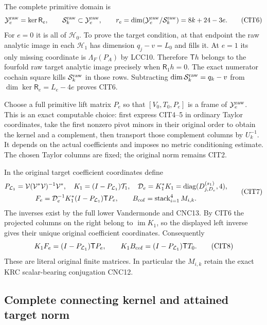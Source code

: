 \documentclass[10pt]{article}
\begin{document}
The complete primitive domain is
\[
 \mathcal Y_e^{\rm raw}=\ker\mathsf R_e,\qquad
 \mathcal S_k^{\rm raw}\subset\mathcal Y_e^{\rm raw},\qquad
 r_e=\dim(\mathcal Y_e^{\rm raw}/\mathcal S_k^{\rm raw})
                  =8k+24-3e .
 \tag{CIT6}
\]
For $e=0$ it is all of $\mathcal H_0$. To prove the target
condition, at that endpoint the raw analytic image in each
$\mathcal H_1$ has dimension $q_j-v=L_0$ and fills it.
At $e=1$ its only missing coordinate is
$\Lambda_F(P_A)$ by LCC10. Therefore
$\mathsf T h$ belongs to the fourfold raw target analytic
image precisely when $\mathsf R_1h=0$. The exact numerator
cochain square kills $\mathcal S_k^{\rm raw}$ in those rows.
Subtracting $\dim\mathcal S_k^{\rm raw}=q_k-v$ from
$\dim\ker\mathsf R_e=L_e-4e$ proves CIT6.

Choose a full primitive lift matrix $P_e$ so that
$[V_0,T_0,P_e]$ is a frame of $\mathcal Y_e^{\rm raw}$.
This is an exact computable choice: first express CIT4--5 in
ordinary Taylor coordinates, take the first nonzero pivot minors
in their original order to obtain the kernel and a complement,
then transport those complement columns by $U_k^{-1}$.
It depends on the actual coefficients and imposes no metric
conditioning estimate. The chosen Taylor columns are fixed;
the original norm remains CIT2.

In the original target coefficient coordinates define
\[
 \begin{gathered}
 P_{\mathcal L_1}=\mathcal V(\mathcal V^*\mathcal V)^{-1}\mathcal V^*,
 \quad K_1=(I-P_{\mathcal L_1})\mathcal T_1,\quad
 \mathcal D_e=K_1^*K_1=\operatorname{diag}(D_{j,D_e}^{(s_1)},4),\\
 F_e=\mathcal D_e^{-1}K_1^*(I-P_{\mathcal L_1})\mathsf T P_e,
 \qquad
 B_{\rm cof}=\operatorname{stack}_{i=1}^4 M_{i,k}.
 \end{gathered}\tag{CIT7}
\]
The inverses exist by the full lower Vandermonde and CNC13.
By CIT6 the projected columns on the right belong to
$\operatorname{im}K_1$, so the displayed left inverse gives
their unique original coefficient coordinates. Consequently
\[
 K_1F_e=(I-P_{\mathcal L_1})\mathsf T P_e,\qquad
 K_1B_{\rm cof}=(I-P_{\mathcal L_1})\mathsf T T_0 .
 \tag{CIT8}
\]
These are literal original finite matrices. In particular the
$M_{i,k}$ retain the exact KRC scalar-bearing conjugation CNC12.

\subsection{Complete connecting kernel and attained target norm}
\end{document}
